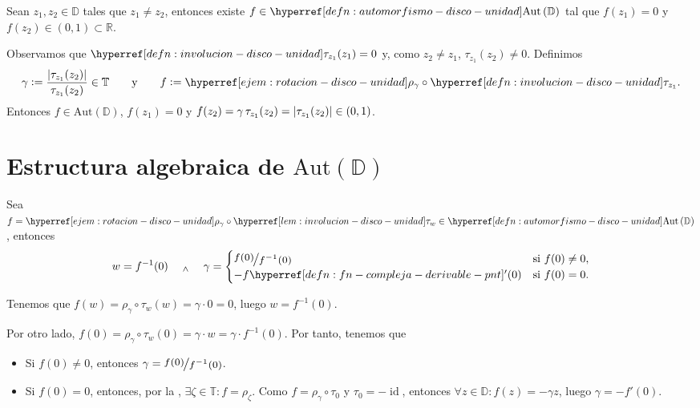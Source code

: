 \begin{prop}\label{prop:aut-disco-unidad-traslada-z1-0-z2-01}
    Sean $z_1, z_2 \in \mathbb{D}$ tales que $z_1 \neq z_2$, entonces existe $f \in \exhyperref[defn:automorfismo-disco-unidad]{automorfismo-disco-unidad}{\mathrm{Aut} \left(\mathbb{D} \right)}$ tal que $f(z_1) = 0$ y $f(z_2) \in (0,1) \subset \mathbb{R}$.
\end{prop}
\begin{dem}
    Observamos que $\exhyperref[defn:involucion-disco-unidad]{involucion-disco-unidad}{\tau_{z_1}}(z_1) = 0$ y, como $z_2 \neq z_1$, $\tau_{z_1}(z_2) \neq 0$. Definimos
    \[\gamma \defeq \frac{\abs{\tau_{z_1}(z_2)}}{\tau_{z_1}(z_2)} \in \mathbb{T} \qquad \tex{y} \qquad f \defeq \exhyperref[ejem:rotacion-disco-unidad]{ejem-rotacion-disco-unidad}{\rho_\gamma} \circ \exhyperref[defn:involucion-disco-unidad]{involucion-disco-unidad}{\tau_{z_1}}.
    \]
    Entonces $f \in \mathrm{Aut} \left(\mathbb{D} \right)$, $f(z_1) = 0$ y $f(z_2) = \gamma \, \tau_{z_1}(z_2) = \left|\tau_{z_1}(z_2)\right| \in (0,1)$. \hfill \qedsymbol
\end{dem}

\section{Estructura algebraica de $\mathrm{Aut} \left(\mathbb{D} \right)$}

\begin{teo}\label{teo:aut-disco-unidad-parametros}
    Sea $f = \exhyperref[ejem:rotacion-disco-unidad]{ejem-rotacion-disco-unidad}{\rho_\gamma} \circ \exhyperref[lem:involucion-disco-unidad]{lem-involucion-disco-unidad}{\tau_w} \in \exhyperref[defn:automorfismo-disco-unidad]{automorfismo-disco-unidad}{\mathrm{Aut} \left(\mathbb{D} \right)}$, entonces
    \[
    w = f^{-1}(0) \quad \we\quad \gamma = \begin{cases}
    \sfrac{f(0)}{f^{-1}(0)} & \text{si } f(0) \neq 0, \\
    -f\exhyperref[defn:fn-compleja-derivable-pnt]{fn-compleja-derivable-pnt}{'}(0) & \text{si } f(0) = 0.
    \end{cases}
    \]
\end{teo}
\begin{dem}
    Tenemos que $f(w) = \rho_\gamma \circ \tau_w(w) = \gamma \cdot 0 = 0$, luego $w = f^{-1}(0)$.

    Por otro lado, $f(0) = \rho_\gamma \circ \tau_w(0) = \gamma \cdot w = \gamma \cdot f^{-1}(0)$. Por tanto, tenemos que
    \begin{itemize}
        \item Si $f(0) \neq 0$, entonces $\gamma = \sfrac{f(0)}{f^{-1}(0)}$.
        \item Si $f(0) = 0$, entonces, por la , $\exists \zeta \in \mathbb{T} : f = \rho_\zeta$. Como $f = \rho_\gamma \circ \tau_0$ y $\tau_0 = -\operatorname{id}$, entonces $\forall z \in \mathbb{D} : f(z) = - \gamma z$, luego $\gamma = -f'(0)$.\hfill\qedsymbol
    \end{itemize}
\end{dem}


